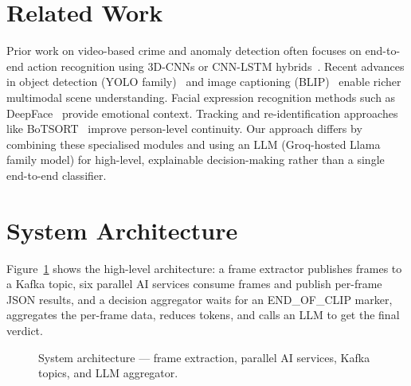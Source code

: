 \documentclass[conference]{IEEEtran}
\begin{document}
\section{Related Work}
Prior work on video-based crime and anomaly detection often focuses on end-to-end action recognition using 3D-CNNs or CNN-LSTM hybrids~\cite{redmon2016you, feichtenhofer2020x3d}. Recent advances in object detection (YOLO family)~\cite{ultralytics2023yolov8} and image captioning (BLIP)~\cite{li2022blip} enable richer multimodal scene understanding. Facial expression recognition methods such as DeepFace~\cite{taigman2014deepface} provide emotional context. Tracking and re-identification approaches like BoTSORT~\cite{botsort2022} improve person-level continuity. Our approach differs by combining these specialised modules and using an LLM (Groq-hosted Llama family model) for high-level, explainable decision-making rather than a single end-to-end classifier.

\section{System Architecture}
Figure~\ref{fig:architecture} shows the high-level architecture: a frame extractor publishes frames to a Kafka topic, six parallel AI services consume frames and publish per-frame JSON results, and a decision aggregator waits for an END_OF_CLIP marker, aggregates the per-frame data, reduces tokens, and calls an LLM to get the final verdict.

\begin{figure}[!t]
  \centering
  \caption{System architecture — frame extraction, parallel AI services, Kafka topics, and LLM aggregator.}
  \label{fig:architecture}
\end{figure}
\end{document}
